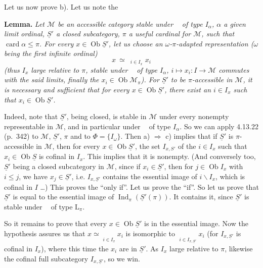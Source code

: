 \documentclass[11pt]{article}
\newcommand{\msp}[1]{\marginpar{\footnotesize [#1]}}
\newcommand{\limind}{\mathop{\underrightarrow{\mathrm{lim}}}}
\begin{document}
Let us now prove b). Let us note the

\textbf{Lemma.} \textit{Let $\mathcal{M}$ be an accessible category stable under $\limind$ of type $I_\alpha$, $\alpha$ a given limit ordinal, $\underline{S}'$ a closed subcategory, $\pi$ a useful cardinal}
\msp{page 17}
\textit{for $\mathcal{M}$, such that} $\operatorname{card}\alpha\leqslant\pi$\textit{. For every $x\in\operatorname{Ob}\underline{S}'$, let us choose an $\omega$-$\pi$-adapted representation ($\omega$ being the first infinite ordinal)}
\[
x\ \simeq\ \limind_{i\in I_x}x_i
\]
\textit{(thus $I_x$ large relative to $\pi$, stable under $\limind$ of type $I_\alpha$, $i\longmapsto x_i:I\longrightarrow\mathcal{M}$ commutes with the said limits, finally the $x_i\in\operatorname{Ob}\mathcal{M}_\pi$). For $\underline{S}'$ to be $\pi$-accessible in $\mathcal{M}$, it is necessary and sufficient that for every $x\in\operatorname{Ob}\underline{S}'$, there exist an $i\in I_x$ such that $x_i\in\operatorname{Ob}\underline{S}'$.}

Indeed, note that $\underline{S}'$, being closed, is stable in $\mathcal{M}$ under every nonempty $\limind$ representable in $\mathcal{M}$, and in particular under $\limind$ of type $I_\alpha$. So we can apply 4.13.22 (p.~342) to $\mathcal{M}$, $\underline{S}'$, $\pi$ and to $\Phi=\{I_\omega\}$. Then a) $\Longrightarrow$ c) implies that if $\underline{S}'$ is $\pi$-accessible in $\mathcal{M}$, then for every $x\in\operatorname{Ob}\underline{S}'$, the set $I_{x,S'}$ of the $i\in I_x$ such that $x_i\in\operatorname{Ob}\underline{S}$ is cofinal in $I_x$. This implies that it is nonempty. (And conversely too, $\underline{S}'$ being a closed subcategory in $\mathcal{M}$, since if $x_i\in\underline{S}'$, then for $j\in\operatorname{Ob}I_x$ with $i\leqslant j$, we have $x_j\in\underline{S}'$, i.e. $I_{x,\underline{S}'}$ contains the essential image of $i\backslash I_x$, which is cofinal in $I$ \dots) This proves the ``only if''. Let us prove the ``if''. So let us prove that $\underline{S}'$ is equal to the essential image of $\operatorname{Ind}_\pi(\underline{S}'(\pi))$. It contains it, since $\underline{S}'$ is stable under $\limind$ of type $\mathrm{L}_\pi$. %

\msp{page 18}
So it remains to prove that every $x\in\operatorname{Ob}\underline{S}'$ is in the essential image. Now the hypothesis assures us that $x\simeq\limind\limits_{i\in I_x}x_i$ is isomorphic to $\limind\limits_{i\in I_{x,\underline{S}'}}x_i$ (for $I_{x,\underline{S}'}$ is cofinal in $I_x$), where this time the $x_i$ are in $\underline{S}'$. As $I_x$ large relative to $\pi$, likewise the cofinal full subcategory $I_{x,\underline{S}'}$, so we win.
\end{document}
